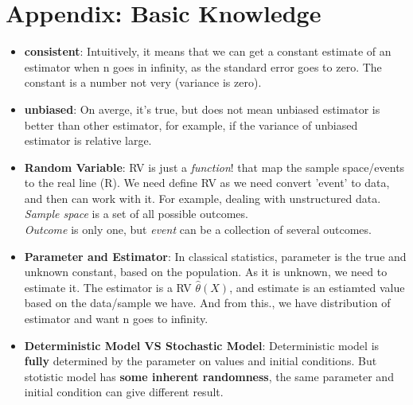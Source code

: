 \documentclass[12pt]{article}
\begin{document}
\newpage
{\color{RoyalBlue}
\section{Appendix: Basic Knowledge}}
\begin{itemize}
\item \textbf{consistent}:
Intuitively, it means that we can get a constant estimate of an estimator when n goes in infinity, as the standard error goes to zero. The constant is a number not very (variance is zero). 

\item \textbf{unbiased}:
On averge, it's true, but does not mean unbiased estimator is better than other estimator, for example, if the variance of unbiased estimator is relative large.

\item \textbf{Random Variable}:
RV is just a \textit{function}! that map the sample space/events to the real line (R). We need define RV as we need convert 'event' to data, and then can work with it. For example, dealing with unstructured data. \\ 
\textit{Sample space} is a set of all possible outcomes.\\
\textit{Outcome} is only one, but \textit{event} can be a collection of several outcomes.

\item \textbf{Parameter and Estimator}:
In classical statistics, parameter is the true and unknown constant, based on the population. As it is unknown, we need to estimate it. The estimator is a RV $\hat{\theta}(X)$, and estimate is an estiamted value based on the data/sample we have. And from this., we have distribution of estimator and want n goes to infinity.
\item
\textbf{Deterministic Model VS Stochastic Model}:
Deterministic model is \textbf{fully} determined by the parameter on values and initial conditions. But stotistic model has \textbf{some inherent randomness}, the same parameter and initial condition can give different result.

\end{itemize}








\setlength{\parskip}{1em}
\end{document}
